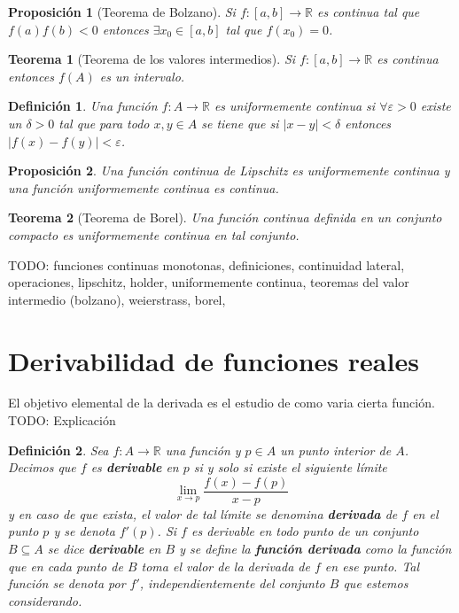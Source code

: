 \documentclass{article}
\newtheorem{theorem}{Teorema}
\newtheorem{prop}{Proposición}
\newtheorem{define}{Definición}
\newcommand{\reales}{\mathbb{R}}
\begin{document}
\begin{prop}[Teorema de Bolzano]
	Si $f: [a, b] \rightarrow \reales$ es continua tal que $f(a)f(b) < 0$ entonces $\exists x_0 \in [a, b]$ tal que $f(x_0) = 0$.
\end{prop}

\begin{theorem}[Teorema de los valores intermedios]
	Si $f: [a, b] \rightarrow \reales$ es continua entonces $f(A)$ es un intervalo.
\end{theorem}

\begin{define}
	Una función $f: A \rightarrow \reales$ es uniformemente continua si $\forall \varepsilon > 0$ existe un $\delta > 0$ tal que para todo $x,y \in A$ se tiene que si $|x-y| < \delta$ entonces $|f(x) - f(y)| < \varepsilon$.
\end{define}

\begin{prop}
	Una función continua de Lipschitz es uniformemente continua y una función uniformemente continua es continua.
\end{prop}

\begin{theorem}[Teorema de Borel]
	Una función continua definida en un conjunto compacto es uniformemente continua en tal conjunto.
\end{theorem}

TODO: funciones continuas monotonas, definiciones, continuidad lateral, operaciones, lipschitz, holder, uniformemente continua, teoremas del valor intermedio (bolzano), weierstrass, borel, 








\newpage
\section{Derivabilidad de funciones reales}
El objetivo elemental de la derivada es el estudio de como varia cierta función. TODO: Explicación 

\begin{define}
	Sea $f: A \rightarrow \reales$ una función y $p \in A$ un punto interior de $A$. Decimos que $f$ es \textbf{derivable} en $p$ si y solo si existe el siguiente límite
	\begin{equation*}
		\lim_{x \rightarrow p} \frac{f(x) - f(p)}{x - p}
	\end{equation*}
	y en caso de que exista, el valor de tal límite se denomina \textbf{derivada} de $f$ en el punto $p$ y se denota $f'(p)$. Si $f$ es derivable en todo punto de un conjunto $B \subseteq A$ se dice \textbf{derivable} en $B$ y se define la \textbf{función derivada} como la función que en cada punto de $B$ toma el valor de la derivada de $f$ en ese punto. Tal función se denota por $f'$, independientemente del conjunto $B$ que estemos considerando. 
\end{define}
\end{document}
